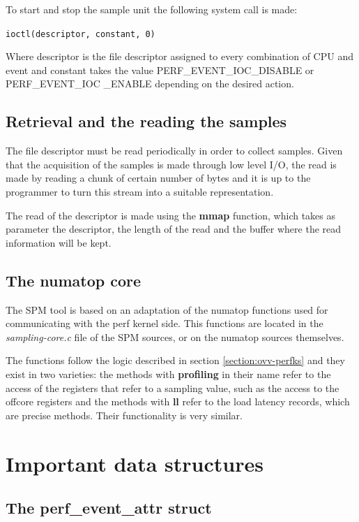 To start and stop the sample unit the following system call is made: 
\\
\begin{center}
\texttt{ioctl(descriptor, constant, 0)}
\end{center}
Where descriptor is the file descriptor assigned to every combination of CPU and event and constant takes the value PERF\_EVENT\_IOC\_DISABLE or PERF\_EVENT\_IOC \_ENABLE depending on the desired action.


\subsection{Retrieval and the reading the samples}\label{section:retr-reaf}

The file descriptor must be read periodically in order to collect samples. Given that the acquisition of the samples is made through low level I/O, the read is made by reading a chunk of certain number of bytes and it is up to the programmer to turn this stream into a suitable representation. 

The read of the descriptor is made using the \textbf{mmap} function, which takes as parameter the descriptor, the length of the read and the buffer where the read information will be kept.

\subsection{The numatop core}\label{section:numatop-core}
The SPM tool is based on an adaptation of the numatop functions used for communicating with the perf kernel side. This functions are located in the \textit{sampling-core.c} file of the SPM sources, or on the numatop sources themselves.

The functions follow the logic described in section \ref{section:ovv-perfks} and they exist in two varieties: the methods with \textbf{profiling} in their name refer to the access of the registers that refer to a sampling value, such as the access to the offcore registers and the methods with \textbf{ll} refer to the load latency records, which are precise methods. Their functionality is very similar. 

\section{Important data structures}\label{section:important-structs}

\subsection{The perf\_event\_attr struct}\label{section:pea-stru}

